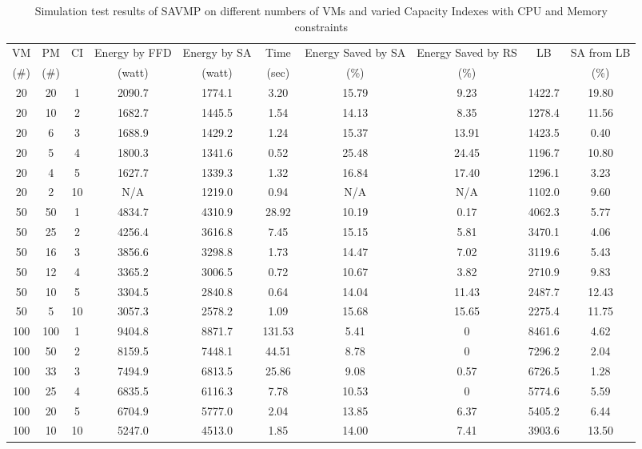 \documentclass[10pt, conference, compsocconf]{IEEEtran}
\begin{document}
\begin{table*}[t]
\begin{center}
\begin{threeparttable}

\caption{Simulation test results of SAVMP on different numbers of VMs and varied
Capacity Indexes with CPU and Memory constraints}
\begin{tabular}{c|c|c|c|c|c|c|c|c|c}
\hline\hline
 VM & PM & CI & Energy by FFD&Energy by SA&Time&Energy
 Saved by SA&Energy Saved by RS& LB & SA from LB\\
 (\#) & (\#) &  & (watt) & (watt)& (sec) & (\%) & (\%) &  &(\%) \\
\hline
20 &20 & 1 & 2090.7 & 1774.1 & 3.20 & 15.79 & 9.23 & 1422.7 & 19.80\\
20 &10 & 2 & 1682.7 & 1445.5 & 1.54 & 14.13 & 8.35 & 1278.4 & 11.56\\
20 &6 & 3 & 1688.9 & 1429.2 & 1.24 & 15.37 & 13.91 & 1423.5 & 0.40\\
20 &5 & 4 & 1800.3 & 1341.6 & 0.52 & 25.48 & 24.45 & 1196.7 & 10.80\\
20 &4 & 5 & 1627.7 & 1339.3 & 1.32 & 16.84 & 17.40 & 1296.1 & 3.23\\
20 &2 & 10 & N/A\tnote{a} & 1219.0 & 0.94 & N/A\tnote{a} & N/A\tnote{a} &
1102.0 & 9.60\\
\hline
50 &50 & 1 & 4834.7 & 4310.9 & 28.92 & 10.19 & 0.17 & 4062.3 & 5.77\\
50 &25 & 2 & 4256.4 & 3616.8 & 7.45 & 15.15 & 5.81 & 3470.1 & 4.06\\
50 &16 & 3 & 3856.6 & 3298.8 & 1.73 & 14.47 & 7.02 & 3119.6 & 5.43\\
50 &12 & 4 & 3365.2 & 3006.5 & 0.72 & 10.67 & 3.82 & 2710.9 & 9.83\\
50 &10 & 5 & 3304.5 & 2840.8 & 0.64 & 14.04 & 11.43 & 2487.7 & 12.43\\
50 &5 & 10 & 3057.3 & 2578.2 & 1.09 & 15.68 & 15.65 & 2275.4 & 11.75\\
\hline
100 &100 & 1 & 9404.8 & 8871.7 & 131.53 & 5.41 & 0 & 8461.6 & 4.62\\
100 &50 & 2 & 8159.5 & 7448.1 & 44.51 & 8.78 & 0 & 7296.2 & 2.04\\
100 &33 & 3 & 7494.9 & 6813.5 & 25.86 & 9.08 & 0.57 & 6726.5 & 1.28\\
100 &25 & 4 & 6835.5 & 6116.3 & 7.78 & 10.53 & 0 & 5774.6 & 5.59\\
100 &20 & 5 & 6704.9 & 5777.0 & 2.04 & 13.85 & 6.37 & 5405.2 & 6.44\\
100 &10 & 10 & 5247.0 & 4513.0 & 1.85 & 14.00 & 7.41 & 3903.6 & 13.50\\

\end{tabular}
\end{threeparttable}
\end{center}
\end{table*}
\end{document}
